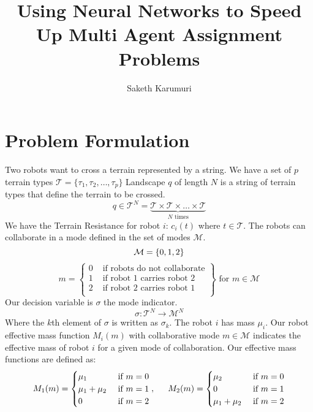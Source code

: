 \documentclass[12pt]{article}
\begin{document}
\title{Using Neural Networks to Speed Up Multi Agent Assignment Problems}
\author{Saketh Karumuri}
\maketitle
\section{Problem Formulation}
Two robots want to cross a terrain represented by a string.
We have a set of $p$ terrain types $\mathcal{T}= \{\tau_1,\tau_2,\dots, \tau_p\}$
Landscape $q$ of length $N$ is a string of terrain types that define the terrain to be crossed.
\begin{equation}
  q \in \mathcal{T}^N = \underbrace{ \mathcal{T} \times \mathcal{T} \times \dots \times \mathcal{T} }_{N\text{ times}}
\end{equation}
We have the Terrain Resistance for robot $i$: $c_i(t)$ where $t\in \mathcal{T}$. The robots can collaborate in a mode defined in the set of modes $\mathcal{ M }$.
\begin{equation}
  \mathcal{ M } = \{0,1,2\} \\
\end{equation}
\begin{equation} 
  m = \left.
    \begin{cases}
    0 & \text{ if robots do not collaborate} \\
    1 & \text{ if robot 1 carries robot 2} \\
    2 & \text{ if robot 2 carries robot 1} \\
\end{cases}\right\} \text{ for } m \in \mathcal{M}
\end{equation}
Our decision variable is $\sigma$ the mode indicator.
\begin{equation}
  \sigma : \mathcal{T} ^N \to \mathcal{ M }^N
\end{equation}
Where the $k$th element of $\sigma$ is written as $\sigma_k$. 
The robot $i$ has mass $ \mu_i$. Our robot effective mass function $M_i(m)$ with collaborative mode $m \in \mathcal{M}$ indicates the effective mass of robot $i$ for a given mode of collaboration. Our effective mass functions are defined as:
\begin{equation}
  M_1(m) = \begin{cases}
    \mu_1 & \text{ if } m=0\\
    \mu_1 + \mu_2 & \text{ if } m=1\\
    0 & \text{ if } m=2
  \end{cases}
  , \hspace{15px}
  M_2(m) = \begin{cases}
    \mu_2 & \text{ if } m=0\\
    0 & \text{ if } m=1\\
    \mu_1 + \mu_2  & \text{ if } m=2
  \end{cases}
\end{equation}
\end{document}
